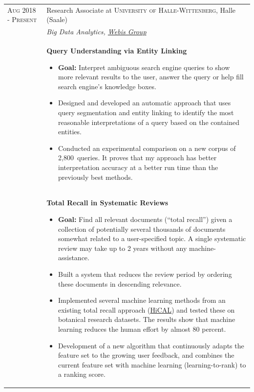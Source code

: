 \documentclass[a4paper,10pt]{article} %
\begin{document}
\begin{longtable}{l p{11cm}}
\textsc{Aug 2018 - Present} & Research Associate at \textsc{University of Halle-Wittenberg}, Halle (Saale)
\\
& \emph{Big Data Analytics, \href{https://webis.de}{Webis Group}}\\[1mm]
& \textbf{\footnotesize{Query Understanding via Entity Linking}}\vspace{0.2em}
  {\footnotesize
  	\begin{itemize}
  		\setlength\itemsep{0.2em}
 		\item \textbf{Goal:} Interpret ambiguous search engine queries to show more relevant results to the user, answer the query or help fill search engine's knowledge boxes. 
 		\item Designed and developed an automatic approach that uses query segmentation and entity linking to identify the most reasonable interpretations of a query based on the contained entities. 
		\item Conducted an experimental comparison on a new corpus of 2,800~queries. It proves that my approach has better interpretation accuracy at a better run time than the previously best methods.    
  \end{itemize}
  }
\\[-2mm]
& \textbf{\footnotesize{Total Recall in Systematic Reviews}}\vspace{0.2em}
  {\footnotesize
  	\begin{itemize}
  		\setlength\itemsep{0.2em}
 		\item \textbf{Goal:} Find all relevant documents (“total recall”) given a collection of potentially several thousands of documents somewhat related to a user-specified topic. A single systematic review may take up to 2 years without any machine-assistance. 
 		\item Built a system that reduces the review period by ordering these documents in descending relevance. 
 		\item Implemented several machine learning methods from an existing total recall approach (\href{https://github.com/hical/HiCAL}{HiCAL}) and tested these on botanical research datasets. The results show that machine learning reduces the human effort by almost 80 percent. 
		\item Development of a new algorithm that continuously adapts the feature set to the growing user feedback, and combines the current feature set with machine learning (learning-to-rank) to a ranking score.    
  \end{itemize}
}
\end{longtable}
\end{document}
